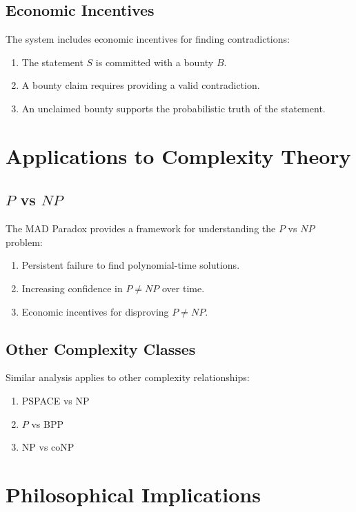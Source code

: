 \documentclass[11pt]{article}
\begin{document}
\subsection{Economic Incentives}

The system includes economic incentives for finding contradictions:
\begin{enumerate}[label=(\arabic*)]
    \item The statement $S$ is committed with a bounty $B$.
    \item A bounty claim requires providing a valid contradiction.
    \item An unclaimed bounty supports the probabilistic truth of the statement.
\end{enumerate}

\section{Applications to Complexity Theory}

\subsection{$P$ vs $NP$}

The MAD Paradox provides a framework for understanding the $P$ vs $NP$ problem:
\begin{enumerate}[label=(\arabic*)]
    \item Persistent failure to find polynomial-time solutions.
    \item Increasing confidence in $P \neq NP$ over time.
    \item Economic incentives for disproving $P \neq NP$.
\end{enumerate}

\subsection{Other Complexity Classes}

Similar analysis applies to other complexity relationships:
\begin{enumerate}[label=(\arabic*)]
    \item PSPACE vs NP
    \item $P$ vs BPP
    \item NP vs coNP
\end{enumerate}

\section{Philosophical Implications}
\end{document}
